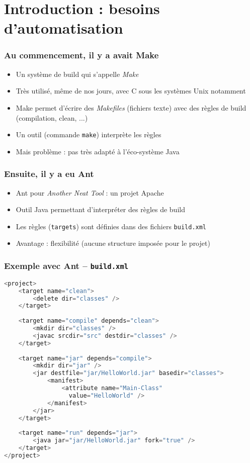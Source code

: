 \documentclass{beamer}
\begin{document}
\section{Introduction : besoins d'automatisation}

\begin{frame}[fragile]
  \frametitle{Au commencement, il y a avait Make}
\begin{itemize}
\item Un système de build qui s'appelle \textit{Make}
\item Très utilisé, même de nos jours, avec C sous les systèmes Unix
  notamment
\item Make permet d'écrire des \textit{Makefiles} (fichiers texte)
  avec des règles de build (compilation, clean, ...)
\item Un outil (commande \texttt{make}) interprète les règles
\item Mais problème : pas très adapté à l'éco-système Java
\end{itemize}
\end{frame}

\begin{frame}[fragile]
  \frametitle{Ensuite, il y a eu Ant}
\begin{itemize}
\item Ant pour \textit{Another Neat Tool} : un projet Apache
\item Outil Java permettant d'interpréter des règles de build
\item Les règles (\texttt{targets}) sont définies dans des fichiers
  \texttt{build.xml}
\item Avantage : flexibilité (aucune structure imposée pour le projet)
\end{itemize}
\end{frame}

\begin{frame}[fragile]
  \frametitle{Exemple avec Ant -- \texttt{build.xml}}
\begin{lstlisting}[language=Java,basicstyle=\tiny]
<project>
    <target name="clean">
        <delete dir="classes" />
    </target>
 
    <target name="compile" depends="clean">
        <mkdir dir="classes" />
        <javac srcdir="src" destdir="classes" />
    </target>
 
    <target name="jar" depends="compile">
        <mkdir dir="jar" />
        <jar destfile="jar/HelloWorld.jar" basedir="classes">
            <manifest>
                <attribute name="Main-Class"
                  value="HelloWorld" />
            </manifest>
        </jar>
    </target>
 
    <target name="run" depends="jar">
        <java jar="jar/HelloWorld.jar" fork="true" />
    </target>
</project>
\end{lstlisting}

\end{frame}
\end{document}
